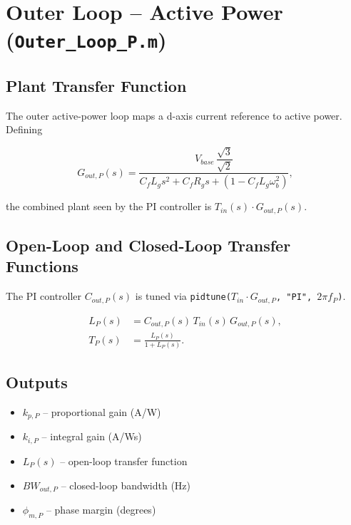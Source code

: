 \documentclass[12pt, a4paper]{article}
\begin{document}
\section{Outer Loop -- Active Power (\texttt{Outer\_Loop\_P.m})}

\subsection{Plant Transfer Function}

The outer active-power loop maps a d-axis current reference to active power.
Defining

\begin{equation}
    G_{out,P}(s)
    = \frac{V_{base}\,\dfrac{\sqrt{3}}{\sqrt{2}}}
           {C_f L_g s^{2}
            + C_f R_g s
            + \!\left(1 - C_f L_g \omega_b^{2}\right)},
\end{equation}

the combined plant seen by the PI controller is $T_{in}(s)\cdot G_{out,P}(s)$.

\subsection{Open-Loop and Closed-Loop Transfer Functions}

The PI controller $C_{out,P}(s)$ is tuned via
\texttt{pidtune($T_{in}\cdot G_{out,P}$, "PI", $2\pi f_{P}$)}.

\begin{align}
    L_{P}(s) &= C_{out,P}(s)\,T_{in}(s)\,G_{out,P}(s),  \\[4pt]
    T_{P}(s) &= \frac{L_{P}(s)}{1 + L_{P}(s)}.
\end{align}

\subsection{Outputs}
\begin{itemize}
    \item $k_{p,P}$ -- proportional gain (A/W)
    \item $k_{i,P}$ -- integral gain (A/Ws)
    \item $L_P(s)$ -- open-loop transfer function
    \item $BW_{out,P}$ -- closed-loop bandwidth (Hz)
    \item $\phi_{m,P}$ -- phase margin (degrees)
\end{itemize}
\end{document}
